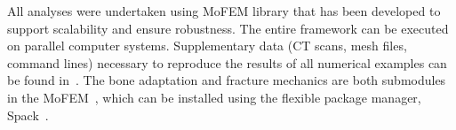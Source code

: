 \documentclass[onecolumn]{svjour3}
\begin{document}
All analyses were undertaken using MoFEM library \cite{mofemJoss2020} that has been developed to support scalability and ensure robustness. 
The entire framework can be executed on parallel computer systems. Supplementary data (CT scans, mesh files, command lines) 
necessary to reproduce the results of all numerical examples can be found in~\cite{karol_lewandowski_2019_dataset}. 
The bone adaptation and fracture mechanics are both submodules in the MoFEM~\cite{mofemJoss2020}, 
which can be installed using the flexible package manager, Spack~\cite{spack2015}. 


%
%


\end{document}
